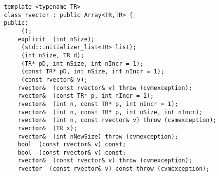 \bigskip
\noindent%
\verb"template <typename TR>"\\
\verb"class rvector : public Array<TR,TR> {"\\
\verb"public:"\\
\verb"    "\verb" ();"\\
\verb"    explicit "\verb" (int nSize);"\\
\verb"    "\verb" (std::initializer_list<TR> list);"\\
\verb"    "\verb" (int nSize, TR d);"\\
\verb"    "\verb" (TR* pD, int nSize, int nIncr = 1);"\\
\verb"    "\verb" (const TR* pD, int nSize, int nIncr = 1);"\\
\verb"    "\verb" (const rvector& v);"\\
\verb"    rvector& "\verb" (const rvector& v) throw (cvmexception);"\\
\verb"    rvector& "\verb" (const TR* p, int nIncr = 1);"\\
\verb"    rvector& "\verb" (int n, const TR* p, int nIncr = 1);"\\
\verb"    rvector& "\verb" (int n, const TR* p, int nSize, int nIncr);"\\
\verb"    rvector& "\verb" (int n, const rvector& v) throw (cvmexception);"\\
\verb"    rvector& "\verb" (TR x);"\\
\verb"    rvector& "\verb" (int nNewSize) throw (cvmexception);"\\
\verb"    bool "\verb" (const rvector& v) const;"\\
\verb"    bool "\verb" (const rvector& v) const;"\\
\verb"    rvector& "\verb" (const rvector& v) throw (cvmexception);"\\
\verb"    rvector "\verb" (const rvector& v) const throw (cvmexception);"\\
